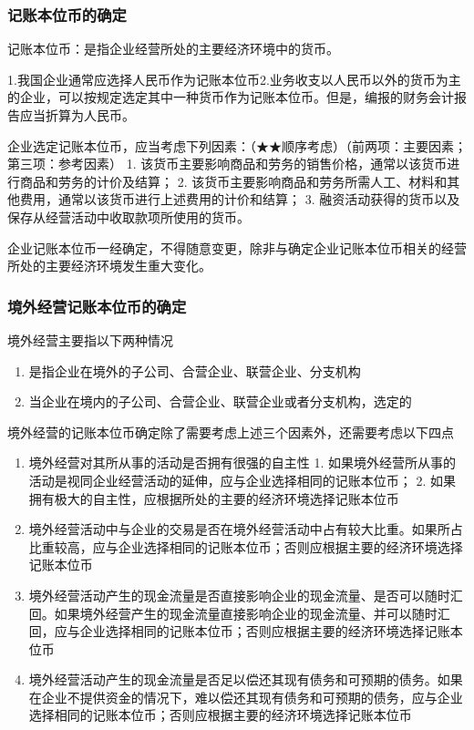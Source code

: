 \documentclass[UTF8,12pt]{ctexart}
\numberwithin{equation}{section} %
\numberwithin{figure}{section}
\numberwithin{table}{section}
\begin{document}
	\subsubsection{记账本位币的确定}
	记账本位币：是指企业经营所处的主要经济环境中的货币。
	
	1.我国企业通常应选择人民币作为记账本位币2.业务收支以人民币以外的货币为主的企业，可以按规定选定其中一种货币作为记账本位币。但是，编报的财务会计报告应当折算为人民币。
	
	企业选定记账本位币，应当考虑下列因素：（★★顺序考虑）（前两项：主要因素；第三项：参考因素）
	1.	该货币主要影响商品和劳务的销售价格，通常以该货币进行商品和劳务的计价及结算；
	2.	该货币主要影响商品和劳务所需人工、材料和其他费用，通常以该货币进行上述费用的计价和结算；
	3.	融资活动获得的货币以及保存从经营活动中收取款项所使用的货币。
	
	企业记账本位币一经确定，不得随意变更，除非与确定企业记账本位币相关的经营所处的主要经济环境发生重大变化。
	
	\subsubsection{境外经营记账本位币的确定}
	境外经营主要指以下两种情况
	\begin{enumerate}
		\item 是指企业在境外的子公司、合营企业、联营企业、分支机构
		
		\item 当企业在境内的子公司、合营企业、联营企业或者分支机构，选定的
	\end{enumerate}
	
	境外经营的记账本位币确定除了需要考虑上述三个因素外，还需要考虑以下四点
	\begin{enumerate}
		\item 境外经营对其所从事的活动是否拥有很强的自主性
		1.	如果境外经营所从事的活动是视同企业经营活动的延伸，应与企业选择相同的记账本位币；
		2.	如果拥有极大的自主性，应根据所处的主要的经济环境选择记账本位币
		
		\item 境外经营活动中与企业的交易是否在境外经营活动中占有较大比重。如果所占比重较高，应与企业选择相同的记账本位币；否则应根据主要的经济环境选择记账本位币
		
		\item 境外经营活动产生的现金流量是否直接影响企业的现金流量、是否可以随时汇回。如果境外经营产生的现金流量直接影响企业的现金流量、并可以随时汇回，应与企业选择相同的记账本位币；否则应根据主要的经济环境选择记账本位币
		
		\item 境外经营活动产生的现金流量是否足以偿还其现有债务和可预期的债务。如果在企业不提供资金的情况下，难以偿还其现有债务和可预期的债务，应与企业选择相同的记账本位币；否则应根据主要的经济环境选择记账本位币
	\end{enumerate}
	
\end{document}
